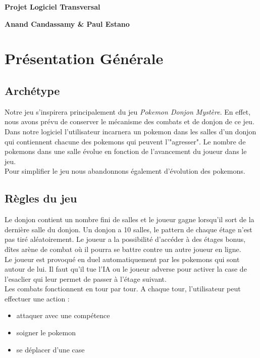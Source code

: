 \documentclass[a4paper,12pt]{article}
\begin{document}
    \begin{titlepage}

        \vspace*{2cm}

        \begin{center}\textbf{\Huge Projet Logiciel Transversal}\end{center}{\Large \par}

        \begin{center}\textbf{\large Anand Candassamy \& Paul Estano}\end{center}{\large \par}

        \vspace{2cm}

        \clearpage

        {\small
        \tableofcontents
        }

    \end{titlepage}

    \clearpage
    \section{Présentation Générale}

    \subsection{Archétype}
	    Notre jeu s'inspirera principalement du jeu \emph{Pokemon Donjon Mystère}. En effet, nous avons prévu de conserver le mécanisme des combats et de donjon de ce jeu.
	    \\Dans notre logiciel l'utilisateur incarnera un pokemon dans les salles d'un donjon qui contiennent chacune des pokemons qui peuvent l'"agresser". Le nombre de pokemons dans une salle évolue en fonction de l'avancement du joueur dans le jeu. 
	    \\Pour simplifier le jeu nous abandonnons également d'évolution des pokemons.

    \subsection{Règles du jeu}
	  Le donjon contient un nombre fini de salles et le joueur gagne lorsqu'il sort de la dernière salle du donjon.
	  Un donjon a 10 salles, le pattern de chaque étage n'est pas tiré aléatoirement. Le joueur a la possibilité d'accéder à des étages bonus, dîtes arène de combat où il pourra se battre contre un autre joueur en ligne.
	   \\Le joueur est provoqué en duel automatiquement par les pokemons qui sont autour de lui. Il faut qu'il tue l'IA ou le joueur adverse pour activer la case de l'esaclier qui leur permet de passer à l'étage suivant.
\\Les combats fonctionnent en tour par tour. A chaque tour, l'utilisateur peut effectuer une action :
\begin{itemize}
    \item attaquer avec une compétence
    \item soigner le pokemon
    \item se déplacer d'une case
\end{itemize}
\clearpage
\end{document}
